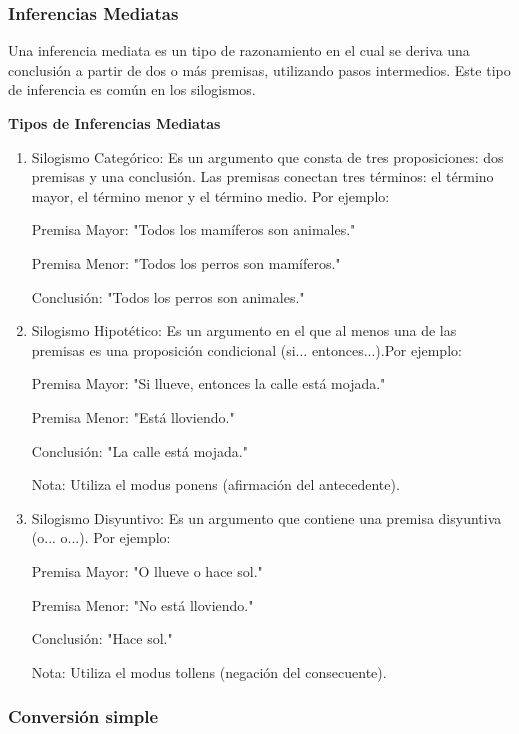 \subsubsection{Inferencias Mediatas}

Una inferencia mediata es un tipo de razonamiento en el cual se deriva una conclusión a partir de dos o más premisas, utilizando pasos intermedios. Este tipo de inferencia es común en los silogismos.

\textbf{Tipos de Inferencias Mediatas}

\begin{enumerate}
   \item Silogismo Categórico: Es un argumento que consta de tres proposiciones: dos premisas y una conclusión. Las premisas conectan tres términos: el término mayor, el término menor y el término medio. Por ejemplo:
         
         Premisa Mayor: "Todos los mamíferos son animales."
         
         Premisa Menor: "Todos los perros son mamíferos."
         
         Conclusión: "Todos los perros son animales."
         
   \item Silogismo Hipotético: Es un argumento en el que al menos una de las premisas es una proposición condicional (si... entonces...).Por ejemplo:
         
         Premisa Mayor: "Si llueve, entonces la calle está mojada."
         
         Premisa Menor: "Está lloviendo."
         
         Conclusión: "La calle está mojada."
         
         Nota: Utiliza el modus ponens (afirmación del antecedente).
         
   \item Silogismo Disyuntivo: Es un argumento que contiene una premisa disyuntiva (o... o...). Por ejemplo:
         
         Premisa Mayor: "O llueve o hace sol."
         
         Premisa Menor: "No está lloviendo."
         
         Conclusión: "Hace sol."
         
         Nota: Utiliza el modus tollens (negación del consecuente).
\end{enumerate}

\subsubsection{Conversión simple}

